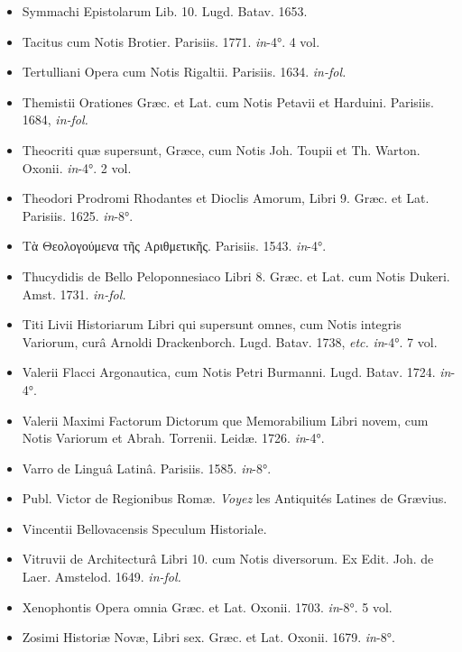 \documentclass[a4paper, 18pt, oneside]{article}
\begin{document}
\begin{itemize}
    \item Symmachi Epistolarum Lib. 10. Lugd. Batav. 1653.

    \item Tacitus cum Notis Brotier. Parisiis. 1771. \emph{in}-4°. 4 vol.

    \item Tertulliani Opera cum Notis Rigaltii. Parisiis. 1634. \emph{in-fol.}

    \item Themistii Orationes Græc. et Lat. cum Notis Petavii et Harduini. Parisiis. 1684, \emph{in-fol.}

    \item Theocriti quæ supersunt, Græce, cum Notis Joh. Toupii et Th. Warton. Oxonii. \emph{in}-4°. 2 vol.

    \item Theodori Prodromi Rhodantes et Dioclis Amorum, Libri 9. Græc. et Lat. Parisiis. 1625. \emph{in}-8°.

    \item Τὰ Θεολογούμενα τῆς Αριθμετικῆς. Parisiis. 1543. \emph{in}-4°.

    \item Thucydidis de Bello Peloponnesiaco Libri 8. Græc. et Lat. cum Notis Dukeri. Amst. 1731. \emph{in-fol.}

    \item Titi Livii Historiarum Libri qui supersunt omnes, cum Notis integris Variorum, curâ Arnoldi Drackenborch. Lugd. Batav. 1738, \emph{etc.} \emph{in}-4°. 7 vol.

    \item Valerii Flacci Argonautica, cum Notis Petri Burmanni. Lugd. Batav. 1724. \emph{in}-4°.

    \item Valerii Maximi Factorum Dictorum que Memorabilium Libri novem, cum Notis Variorum et Abrah. Torrenii. Leidæ. 1726. \emph{in}-4°.

    \item Varro de Linguâ Latinâ. Parisiis. 1585. \emph{in}-8°.

    \item Publ. Victor de Regionibus Romæ. \emph{Voyez} les Antiquités Latines de Grævius.

    \item Vincentii Bellovacensis Speculum Historiale.

    \item Vitruvii de Architecturâ Libri 10. cum Notis diversorum. Ex Edit. Joh. de Laer. Amstelod. 1649. \emph{in-fol.}

    \item Xenophontis Opera omnia Græc. et Lat. Oxonii. 1703. \emph{in}-8°. 5 vol.

    \item Zosimi Historiæ Novæ, Libri sex. Græc. et Lat. Oxonii. 1679. \emph{in}-8°.
\end{itemize}
\clearpage
\end{document}
